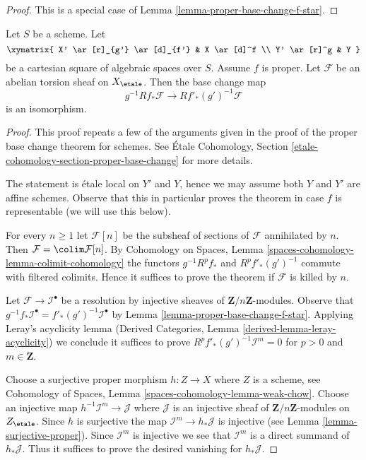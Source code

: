 \begin{proof}
This is a special case of Lemma \ref{lemma-proper-base-change-f-star}.
\end{proof}

\begin{theorem}
\label{theorem-proper-base-change}
Let $S$ be a scheme. Let
$$
\xymatrix{
X' \ar[r]_{g'} \ar[d]_{f'} & X \ar[d]^f \\
Y' \ar[r]^g & Y
}
$$
be a cartesian square of algebraic spaces over $S$.
Assume $f$ is proper.
Let $\mathcal{F}$ be an abelian torsion sheaf on $X_\etale$.
Then the base change map
$$
g^{-1}Rf_*\mathcal{F} \longrightarrow Rf'_*(g')^{-1}\mathcal{F}
$$
is an isomorphism.
\end{theorem}

\begin{proof}
This proof repeats a few of the arguments given in the proof of the
proper base change theorem for schemes. See
\'Etale Cohomology, Section \ref{etale-cohomology-section-proper-base-change}
for more details.

\medskip\noindent
The statement is \'etale local on $Y'$ and $Y$, hence we may assume
both $Y$ and $Y'$ are affine schemes. Observe that this in particular
proves the theorem in case $f$ is representable (we will use this
below).

\medskip\noindent
For every $n \geq 1$ let $\mathcal{F}[n]$ be the subsheaf of sections
of $\mathcal{F}$ annihilated by $n$. Then
$\mathcal{F} = \colim \mathcal{F}[n]$. By 
Cohomology on Spaces, Lemma \ref{spaces-cohomology-lemma-colimit-cohomology}
the functors $g^{-1}R^pf_*$ and $R^pf'_*(g')^{-1}$ commute
with filtered colimits. Hence it suffices to prove the theorem
if $\mathcal{F}$ is killed by $n$.

\medskip\noindent
Let $\mathcal{F} \to \mathcal{I}^\bullet$ be a resolution by
injective sheaves of $\mathbf{Z}/n\mathbf{Z}$-modules.
Observe that
$g^{-1}f_*\mathcal{I}^\bullet = f'_*(g')^{-1}\mathcal{I}^\bullet$
by Lemma \ref{lemma-proper-base-change-f-star}.
Applying Leray's acyclicity lemma
(Derived Categories, Lemma \ref{derived-lemma-leray-acyclicity})
we conclude it suffices to prove
$R^pf'_*(g')^{-1}\mathcal{I}^m = 0$ for $p > 0$ and $m \in \mathbf{Z}$.

\medskip\noindent
Choose a surjective proper morphism
$h : Z \to X$ where $Z$ is a scheme, see
Cohomology of Spaces, Lemma \ref{spaces-cohomology-lemma-weak-chow}.
Choose an injective map $h^{-1}\mathcal{I}^m \to \mathcal{J}$
where $\mathcal{J}$ is an injective sheaf of
$\mathbf{Z}/n\mathbf{Z}$-modules on $Z_\etale$.
Since $h$ is surjective the map $\mathcal{I}^m \to h_*\mathcal{J}$
is injective (see Lemma \ref{lemma-surjective-proper}).
Since $\mathcal{I}^m$ is injective we see that $\mathcal{I}^m$
is a direct summand of $h_*\mathcal{J}$. Thus it suffices
to prove the desired vanishing for $h_*\mathcal{J}$.


\end{proof}
